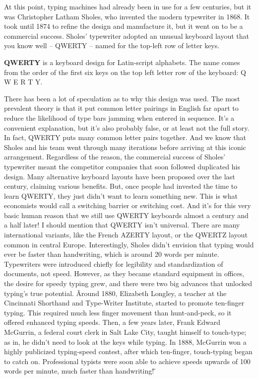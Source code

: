 At this point, typing machines had already been in use for a few centuries, but it was Christopher Latham Sholes, who
invented the modern typewriter in 1868. It took until 1874 to refine the design and manufacture it, but it went on to
be a commercial success. Sholes' typewriter adopted an unusual keyboard layout that you know well – QWERTY – named
for the top-left row of letter keys.

\bd[QWERTY]
\textbf{QWERTY} is a keyboard design for Latin-script alphabets. The name comes from the order of the first six keys
on the top left letter row of the keyboard: Q W E R T Y\@.
\ed

There has been a lot of speculation as to why this design was used. The most prevalent theory is that it put common
letter pairings in English far apart to reduce the likelihood of type bars jamming when entered in sequence. It's a
convenient explanation, but it's also probably false, or at least not the full story. In fact, QWERTY puts many
common letter pairs together. And we know that Sholes and his team went through many iterations before arriving at
this iconic arrangement. Regardless of the reason, the commercial success of Sholes' typewriter meant the competitor
companies that soon followed duplicated his design. Many alternative keyboard layouts have been proposed over the
last century, claiming various benefits. But, once people had invested the time to learn QWERTY, they just didn't
want to learn something new. This is what economists would call a switching barrier or switching cost. And it's for
this very basic human reason that we still use QWERTY keyboards almost a century and a half later! I should mention
that QWERTY isn't universal. There are many international variants, like the French AZERTY layout, or the QWERTZ
layout common in central Europe. Interestingly, Sholes didn't envision that typing would ever be faster than
handwriting, which is around 20 words per minute. Typewriters were introduced chiefly for legibility and
standardization of documents, not speed. However, as they became standard equipment in offices, the desire for speedy
typing grew, and there were two big advances that unlocked typing's true potential. \v

Around 1880, Elizabeth Longley, a teacher at the Cincinnati Shorthand and Type-Writer Institute, started to promote
ten-finger typing. This required much less finger movement than hunt-and-peck, so it offered enhanced typing speeds.
Then, a few years later, Frank Edward McGurrin, a federal court clerk in Salt Lake City, taught himself to
touch-type; as in, he didn't need to look at the keys while typing. In 1888, McGurrin won a highly publicized
typing-speed contest, after which ten-finger, touch-typing began to catch on. Professional typists were soon able to
achieve speeds upwards of 100 words per minute, much faster than handwriting! \v

